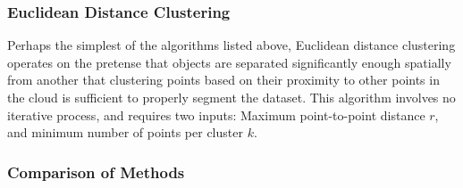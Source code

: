 \documentclass[12pt]{drexelthesis}
\begin{document}
\subsubsection{Euclidean Distance Clustering}
Perhaps the simplest of the algorithms listed above, Euclidean distance clustering operates on the pretense that objects are separated significantly enough spatially from another that clustering points based on their proximity to other points in the cloud is sufficient to properly segment the dataset. This algorithm involves no iterative process, and requires two inputs: Maximum point-to-point distance $r$, and minimum number of points per cluster $k$.

\subsubsection{Comparison of Methods}
\end{document}
